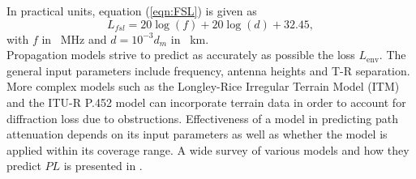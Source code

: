 \documentclass[10pt,journal,twoside]{IEEEtran}
\begin{document}
In practical units, equation (\ref{eqn:FSL}) is given as
\begin{equation}
\label{eqn:FSL2}
L_{fsl} = 20\log\left( f \right) + 20\log\left( d \right) + 32.45,
\end{equation}
with $f$ in \SI{}{MHz} and $d = 10^{-3}d_m$ in \SI{}{km}.\\
Propagation models strive to predict as accurately as possible the loss $L_{\text{env}}$. The general input parameters include frequency, antenna heights and T-R separation. More complex models such as the Longley-Rice Irregular Terrain Model (ITM) and the ITU-R P.\num{452} model can incorporate terrain data in order to account for diffraction loss due to obstructions. Effectiveness of a model in predicting path attenuation depends on its input parameters as well as whether the model is applied within its coverage range. A wide survey of various models and how they predict $PL$ is presented in \cite{Phillips:Survey}.  %
%
%
\end{document}
